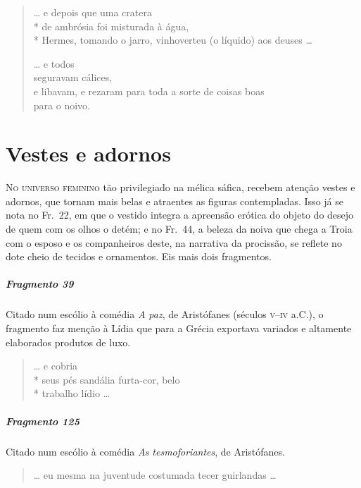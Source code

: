 {\begin{verse}
\ldots{} e depois que uma cratera\\*
de ambrósia foi misturada à água,\\*
Hermes, tomando o jarro, vinhoverteu (o líquido) \qb{}aos deuses \ldots{}

\ldots{} e todos\\
seguravam cálices,\\
e libavam, e rezaram para toda a sorte de coisas boas\\
para o noivo.
\end{verse}

\chapter{Vestes e adornos}

\textsc{No universo feminino} tão privilegiado na mélica sáfica, recebem atenção vestes e
adornos, que tornam mais belas e atraentes as figuras contempladas. Isso já se
nota no Fr.~22, em que o vestido integra a apreensão erótica do objeto do
desejo de quem com os olhos o detém; e no Fr.~44, a beleza da noiva que chega a
Troia com o esposo e os companheiros deste, na narrativa da procissão, se
reflete no dote cheio de tecidos e ornamentos. Eis mais dois fragmentos.


\paragraph{Fragmento 39}

{\small Citado num escólio à comédia \textit{A paz}, de Aristófanes (séculos \textsc{v}--\textsc{iv} a.C.),
o fragmento faz menção à Lídia que para a Grécia exportava variados e altamente
elaborados produtos de luxo.}

\begin{verse}
\ldots{} e cobria\\*
seus pés sandália furta-cor, belo\\*
trabalho lídio \ldots{}
\end{verse}

\paragraph{Fragmento 125}

{\small Citado num escólio à comédia \textit{As tesmoforiantes}, de Aristófanes.}

\begin{verse}
\ldots{} eu mesma na juventude costumada tecer \qb{}guirlandas \ldots{}
\end{verse}


}
